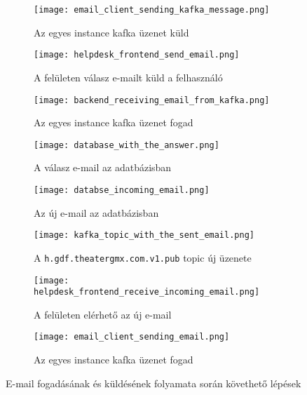 \begin{figure}
	\begin{subfigure}{.49\textwidth}
		\centering
		\texttt{[image: email\_client\_sending\_kafka\_message.png]}  
		\caption{Az egyes instance kafka üzenet küld}
		\label{fig:email_client_send_kafka}
	\end{subfigure}
	\begin{subfigure}{.49\textwidth}
		\centering
		\texttt{[image: helpdesk\_frontend\_send\_email.png]}  
		\caption{A felületen válasz e-mailt küld a felhasználó}
		\label{fig:frontend_send_answer}
	\end{subfigure}
	
	\quad
	
	\begin{subfigure}{.49\textwidth}
		\centering
		\texttt{[image: backend\_receiving\_email\_from\_kafka.png]}  
		\caption{Az egyes instance kafka üzenet fogad}
		\label{fig:backend_receive_kafka}
	\end{subfigure}
	\begin{subfigure}{.49\textwidth}
		\centering
		\texttt{[image: database\_with\_the\_answer.png]}  
		\caption{A válasz e-mail az adatbázisban}
		\label{fig:database_answer}
	\end{subfigure}
	
	\quad
	
	\begin{subfigure}{.49\textwidth}
		\centering
		\texttt{[image: databse\_incoming\_email.png]}  
		\caption{Az új e-mail az adatbázisban}
		\label{fig:datbase_received_email}
	\end{subfigure}
	\begin{subfigure}{.49\textwidth}
		\centering
		\texttt{[image: kafka\_topic\_with\_the\_sent\_email.png]}  
		\caption{A \texttt{h.gdf.theater\textunderscore gmx.com.v1.pub} topic új üzenete}
		\label{fig:kafka_topic_send_email}
	\end{subfigure}
	
	\quad
	
	\begin{subfigure}{.45\textwidth}
		\centering
		\texttt{[image: helpdesk\_frontend\_receive\_incoming\_email.png]}  
		\caption{A felületen elérhető az új e-mail}
		\label{fig:frontend_read_email}
	\end{subfigure}
	\begin{subfigure}{.45\textwidth}
		\centering
		\texttt{[image: email\_client\_sending\_email.png]}  
		\caption{Az egyes instance kafka üzenet fogad}
		\label{fig:email_client_receives_kafka}
	\end{subfigure}
	
	\caption[E-mail fogadásának és küldésének folyamata]{E-mail fogadásának és küldésének folyamata során követhető lépések}
	\label{fig:email_send_receive_visible}
\end{figure}


